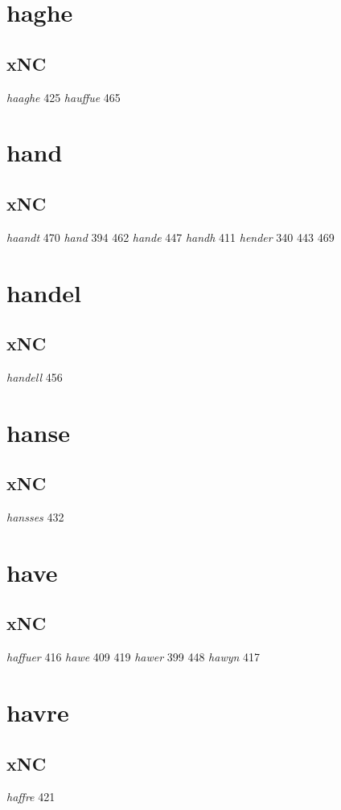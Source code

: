 \documentclass[a4paper,twocolumn]{article}
\begin{document}
\section{haghe}
\label{sec:org035a349}
\subsection{xNC}
\label{sec:org966131c}
\emph{haaghe} 425 \emph{hauffue} 465 
\section{hand}
\label{sec:orgcf60484}
\subsection{xNC}
\label{sec:org801c6b2}
\emph{haandt} 470 \emph{hand} 394 462 \emph{hande} 447 \emph{handh} 411 \emph{hender} 340 443 469 
\section{handel}
\label{sec:org61b9a6a}
\subsection{xNC}
\label{sec:orga26e029}
\emph{handell} 456 
\section{hanse}
\label{sec:orge405513}
\subsection{xNC}
\label{sec:org4ff2d71}
\emph{hansses} 432 
\section{have}
\label{sec:org556489e}
\subsection{xNC}
\label{sec:org195b37c}
\emph{haffuer} 416 \emph{hawe} 409 419 \emph{hawer} 399 448 \emph{hawyn} 417 
\section{havre}
\label{sec:orgbd9ff63}
\subsection{xNC}
\label{sec:orgb51e3d2}
\emph{haffre} 421 
\end{document}
